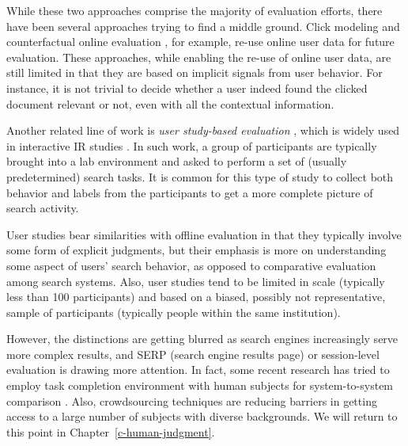 While these two approaches comprise the majority of evaluation efforts, there have been several approaches trying to find a middle ground. Click modeling \citep{chuklin2015click} and counterfactual online evaluation \citep{Li:2015, li2010contextual}, for example, re-use online user data for future evaluation. These approaches, while enabling the re-use of online user data, are still limited in that they are based on implicit signals from user behavior. For instance, it is not trivial to decide whether a user indeed found the clicked document relevant or not, even with all the contextual information.


Another related line of work is \textit{user study-based evaluation} \citep{Bron:2013, Liu:2014, Shah:2011}, which is widely used in interactive IR studies \citep{kelly2009methods}. In such work, a group of participants are typically brought into a lab environment and asked to perform a set of (usually predetermined) search tasks. It is common for this type of study to collect both behavior and labels from the participants to get a more complete picture of search activity. 

User studies bear similarities with offline evaluation in that they typically involve some form of explicit judgments, but their emphasis is more on understanding some aspect of users' search behavior, as opposed to comparative evaluation among search systems. Also, user studies tend to be limited in scale (typically less than 100 participants) and based on a biased, possibly not representative, sample of participants (typically people within the same institution).


However, the distinctions are getting blurred as search engines increasingly serve more complex results, and SERP (search engine results page) or session-level evaluation is drawing more attention. In fact, some recent research has tried to employ task completion environment with human subjects for system-to-system comparison \citep{Xu:2009}. Also, crowdsourcing techniques are reducing barriers in getting access to a large number of subjects with diverse backgrounds. We will return to this point in Chapter~\ref{c-human-judgment}.

